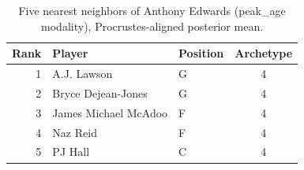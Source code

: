 \begin{table}[htbp]
  \centering\small
  \begin{tabular}{rllc}
    \toprule
    Rank & Player & Position & Archetype \\
    \midrule
    1 & A.J. Lawson & G & 4 \\
    2 & Bryce Dejean-Jones & G & 4 \\
    3 & James Michael McAdoo & F & 4 \\
    4 & Naz Reid & F & 4 \\
    5 & PJ Hall & C & 4 \\
    \bottomrule
  \end{tabular}
  \caption{Five nearest neighbors of Anthony Edwards (peak_age modality), Procrustes-aligned posterior mean.}
  \label{tab:Anthony_Edwards_neighbors_peak_age}
\end{table}

